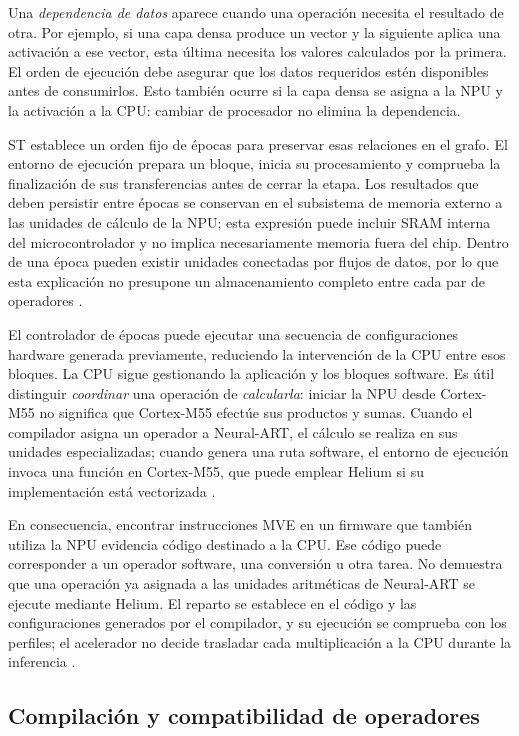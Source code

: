 Una \emph{dependencia de datos} aparece cuando una operación necesita el resultado de otra. Por ejemplo, si una capa densa produce un vector y la siguiente aplica una activación a ese vector, esta última necesita los valores calculados por la primera. El orden de ejecución debe asegurar que los datos requeridos estén disponibles antes de consumirlos. Esto también ocurre si la capa densa se asigna a la NPU y la activación a la CPU: cambiar de procesador no elimina la dependencia.

ST establece un orden fijo de épocas para preservar esas relaciones en el grafo. El entorno de ejecución prepara un bloque, inicia su procesamiento y comprueba la finalización de sus transferencias antes de cerrar la etapa. Los resultados que deben persistir entre épocas se conservan en el subsistema de memoria externo a las unidades de cálculo de la NPU; esta expresión puede incluir SRAM interna del microcontrolador y no implica necesariamente memoria fuera del chip. Dentro de una época pueden existir unidades conectadas por flujos de datos, por lo que esta explicación no presupone un almacenamiento completo entre cada par de operadores \cite{cap4_stconcepts}.

El controlador de épocas puede ejecutar una secuencia de configuraciones hardware generada previamente, reduciendo la intervención de la CPU entre esos bloques. La CPU sigue gestionando la aplicación y los bloques software. Es útil distinguir \emph{coordinar} una operación de \emph{calcularla}: iniciar la NPU desde Cortex-M55 no significa que Cortex-M55 efectúe sus productos y sumas. Cuando el compilador asigna un operador a Neural-ART, el cálculo se realiza en sus unidades especializadas; cuando genera una ruta software, el entorno de ejecución invoca una función en Cortex-M55, que puede emplear Helium si su implementación está vectorizada \cite{cap4_stconcepts,cap4_cmsisnn}.

En consecuencia, encontrar instrucciones MVE en un firmware que también utiliza la NPU evidencia código destinado a la CPU. Ese código puede corresponder a un operador software, una conversión u otra tarea. No demuestra que una operación ya asignada a las unidades aritméticas de Neural-ART se ejecute mediante Helium. El reparto se establece en el código y las configuraciones generados por el compilador, y su ejecución se comprueba con los perfiles; el acelerador no decide trasladar cada multiplicación a la CPU durante la inferencia \cite{cap4_stconcepts,cap4_stcompiler}.

\subsection{Compilación y compatibilidad de operadores}\label{sec:cap4_compilacion}
